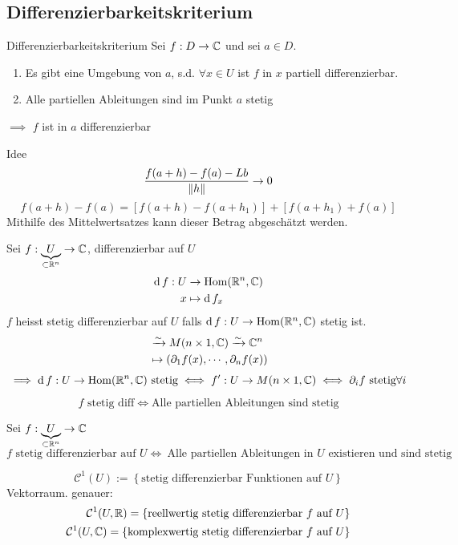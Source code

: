 \subsection{Differenzierbarkeitskriterium}
\begin{Sat}{Differenzierbarkeitskriterium}
  Sei $f:D\to\mathbb{C}$ und sei $a\in D$.
  \begin{enumerate}
    \item Es gibt eine Umgebung von $a$, s.d. $\forall x\in U$ ist $f$ in $x$ partiell differenzierbar.
    \item Alle partiellen Ableitungen sind im Punkt $a$ stetig
  \end{enumerate}
  $\implies$ $f$ ist in $a$ differenzierbar
\end{Sat}
\begin{Bew}{Idee}
  \[\frac{f(a+h)-f(a)-Lb}{\left\| h \right\|}\to 0\]
  \[f(a+h)-f(a)=\left[ f(a+h)-f(a+h_1) \right]+\left[ f(a+h_1)+f(a) \right]\]
  Mithilfe des Mittelwertsatzes kann dieser Betrag abgeschätzt werden.
\end{Bew}
\begin{Def}
  Sei $f:\underbrace{U}_{\subset\mathbb{R}^n}\to \mathbb{C}$, differenzierbar auf $U$
  \begin{align*}
    \operatorname{d} f: U&\to \operatorname{Hom}(\mathbb{R}^n,\mathbb{C})\\
    x&\mapsto\operatorname{d} f_x
  \end{align*}
  $f$ heisst stetig differenzierbar auf $U$ falls $\operatorname{d} f:U\to\operatorname{Hom}(\mathbb{R}^n,\mathbb{C})$ stetig ist.
  \begin{align*}
    &\xrightarrow{\sim}M(n\times 1,\mathbb{C})\xrightarrow{\sim}\mathbb{C}^n\\
    &\mapsto\left( \partial_1 f(x),\cdots,\partial_n f(x) \right)\\
  \end{align*}
  \[\implies\operatorname{d} f:U\to\operatorname{Hom}(\mathbb{R}^n,\mathbb{C})\ \text{stetig}\iff f':U\to M(n\times 1,\mathbb{C})\iff \partial_if\ \text{stetig}\forall i\]
\end{Def}
\begin{Kor}
  \[\text{$f$ stetig diff}\iff\text{Alle partiellen Ableitungen sind stetig}\]
\end{Kor}
\begin{Kor}
  Sei $f:\underbrace{U}_{\subset\mathbb{R}^n}\to \mathbb{C}$
  \[\text{$f$ stetig differenzierbar auf $U$}\iff\ \text{Alle partiellen Ableitungen in $U$ existieren und sind stetig}\]
\end{Kor}
\begin{Def}
  \[\mathcal{C}^1(U):=\left\{ \text{stetig differenzierbar Funktionen auf $U$} \right\}\]
  Vektorraum. genauer:
  \begin{align*}
    \mathcal{C}^1(U,\mathbb{R})=\left\{ \text{reellwertig stetig differenzierbar $f$ auf $U$} \right\}\\
    \mathcal{C}^1(U,\mathbb{C})=\left\{ \text{komplexwertig stetig differenzierbar $f$ auf $U$} \right\}
  \end{align*}
\end{Def}
